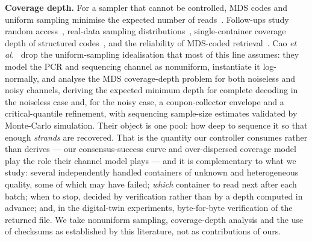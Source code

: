 \documentclass[acmsmall,screen]{acmart}
\begin{document}
\textbf{Coverage depth.}  For a sampler that cannot be controlled, MDS codes and uniform
sampling minimise the expected number of reads~\cite{barlev2025cover}.  Follow-ups study random
access~\cite{gruica2024combinatorial}, real-data sampling distributions~\cite{cao2025optimizing},
single-container coverage depth of structured codes~\cite{bertuzzo2025coverage}, and the
reliability of MDS-coded retrieval~\cite{kashanna2026reliability}.  Cao
\emph{et al.}~\cite{cao2026modeling} drop the uniform-sampling idealisation that most of this line
assumes: they model the PCR and sequencing channel as nonuniform, instantiate it log-normally, and
analyse the MDS coverage-depth problem for both noiseless and noisy channels, deriving the expected
minimum depth for complete decoding in the noiseless case and, for the noisy case, a
coupon-collector envelope and a critical-quantile refinement, with sequencing sample-size estimates
validated by Monte-Carlo simulation.  Their object is one pool: how deep to sequence it so that enough
\emph{strands} are recovered.  That is the quantity our controller consumes rather than derives --- our
consensus-success curve and over-dispersed coverage model play the role their channel model plays --- and
it is complementary to what we study: several independently handled containers of unknown and
heterogeneous quality, some of which may have failed; \emph{which} container to read next after each
batch; when to stop, decided by verification rather than by a depth computed in advance; and, in the
digital-twin experiments, byte-for-byte verification of the returned file.  We take nonuniform sampling,
coverage-depth analysis and the use of checksums as established by this literature, not as contributions
of ours.
\end{document}
